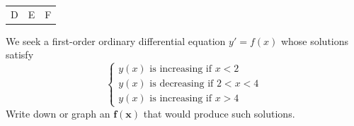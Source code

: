 \begin{tabular}{ccc}
D & E & F \\
\end{tabular}



\bookonlynewpage


\question

We seek a first-order ordinary differential equation 
\quad $y' = f(x)$ \quad 
whose solutions satisfy
$$
\begin{cases}
y(x)  \mbox{ is increasing if } x<2 \\
y(x) \mbox{ is decreasing if } 2 < x < 4 \\
y(x) \mbox{ is increasing if } x > 4
\end{cases}
$$
%
Write down or graph an $\pmb{f(x)}$ that would produce such solutions.




